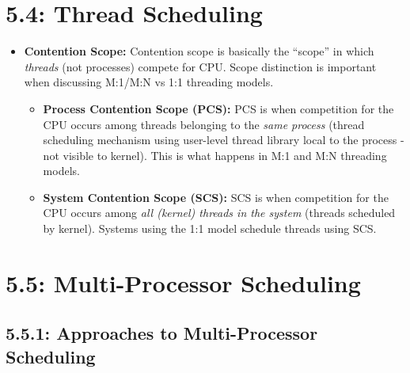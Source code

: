 \documentclass[12pt]{article}
\begin{document}
\section*{5.4: Thread Scheduling}

\begin{itemize}
    \item \textbf{Contention Scope:} Contention scope is basically the ``scope'' in which \textit{threads} (not processes) compete for CPU. Scope distinction is important when discussing M:1/M:N vs 1:1 threading models.
        \begin{itemize}
            \item \textbf{Process Contention Scope (PCS):} PCS is when competition for the CPU occurs among threads belonging to the \textit{same process} (thread scheduling mechanism using user-level thread library local to the process - not visible to kernel). This is what happens in M:1 and M:N threading models.
            \item \textbf{System Contention Scope (SCS):} SCS is when competition for the CPU occurs among \textit{all (kernel) threads in the system} (threads scheduled by kernel). Systems using the 1:1 model schedule threads using SCS.
        \end{itemize}
\end{itemize}

\section*{5.5: Multi-Processor Scheduling}

\subsection*{5.5.1: Approaches to Multi-Processor Scheduling}
\end{document}
